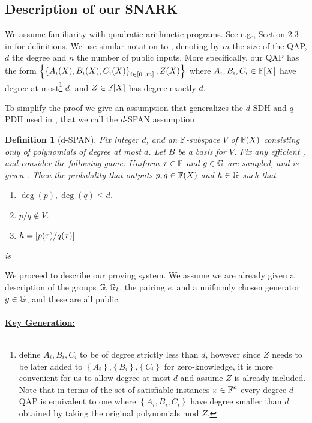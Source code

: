 \documentclass[11pt]{article}
\numberwithin{figure}{section} %
\newtheorem{dfn}[thm]{Definition}
\newcommand{\set}[1]{\ensuremath{\left\{#1\right\}}\xspace}
\begin{document}
\subsection{Description of our SNARK}\label{subsec:SNARK}
We assume familiarity with quadratic arithmetic programs.
See e.g., Section 2.3 in \cite{groth16} for definitions.
We use similar notation to \cite{BCTV}, denoting by $m$ the size of the QAP, $d$ the degree and $n$ the number of public inputs.
More specifically, our QAP has the form \set{\sett{A_i(X),B_i(X),C_i(X)}{i\in [0..m]}, Z(X)}
where $A_i,B_i,C_i\in \mathbb F[X]$ have degree at most\footnote{\cite{BCTV} define $A_i,B_i,C_i$ to be of degree strictly less than $d$, however since $Z$ needs to be later added to \set{A_i},\set{B_i},\set{C_i} for zero-knowledge, it is more convenient for us to allow degree at most $d$ and assume $Z$ is already included. Note that in terms of the set of satisfiable instances $x\in \mathbb F^n$ every degree $d$ QAP is equivalent to one where \set{A_i,B_i,C_i} have degree smaller than $d$ obtained by taking the original polynomials mod $Z$.} $d$, and $Z\in \mathbb F[X]$ has degree exactly $d$.





To simplify the proof we give an assumption that generalizes the $d$-SDH and $q$-PDH used in \cite{PHGR}, 
that we call the $d$-SPAN assumption
\begin{dfn}[d-SPAN]\label{dfn:spanassump}
 Fix integer $d$, and an $\mathbb F$-subspace $V$ of $\mathbb F(X)$ consisting only of polynomials of degree at most $d$.
 Let $B$ be a basis for $V$. Fix any efficient \adv, and consider the following game:
 Uniform $\tau\in \mathbb F$ and $g\in {\mathbb G}$ are sampled, and \adv is given . Then the probability that \adv 
 outputs  $p,q\in \mathbb F(X)$ and $h\in {\mathbb G}$ such that
 \begin{enumerate}
  \item $\deg(p),\deg(q)\leq d$.
  \item $p/q \notin V$.
  \item $h= \left[p(\tau)/q(\tau)\right]$
 \end{enumerate}
is \negl
\end{dfn}



We proceed to describe our proving system.
We assume we are already given a description of the groups ${\mathbb G},{\mathbb G}_t$, the pairing $e$, and a uniformly chosen generator 
$g\in {\mathbb G}$, and these are all public.
\paragraph{\underline{Key Generation:}}
\end{document}
